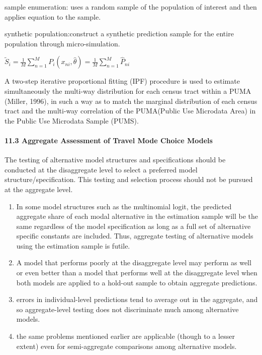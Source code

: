 \documentclass[
]{article}
\begin{document}
sample enumeration: uses a random sample of the population of interest
and then applies equation to the sample.

synthetic population:construct a synthetic prediction sample for the
entire population through micro-simulation.

\(\tilde S_i=\frac1M\sum_{n=1}^MP_i(x_{ni},\hat\theta)=\frac1M\sum_{n=1}^M\hat P_{ni}\)

A two-step iterative proportional fitting (IPF) procedure is used to
estimate simultaneously the multi-way distribution for each census tract
within a PUMA (Miller, 1996), in such a way as to match the marginal
distribution of each census tract and the multi-way correlation of the
PUMA(Public Use Microdata Area) in the Public Use Microdata Sample
(PUMS).

\hypertarget{aggregate-assessment-of-travel-mode-choice-models}{%
\paragraph{11.3 Aggregate Assessment of Travel Mode Choice
Models}\label{aggregate-assessment-of-travel-mode-choice-models}}

The testing of alternative model structures and specifications should be
conducted at the disaggregate level to select a preferred model
structure/specification. This testing and selection process should not
be pursued at the aggregate level.

\begin{enumerate}
\def\labelenumi{\arabic{enumi}.}
\item
  In some model structures such as the multinomial logit, the predicted
  aggregate share of each modal alternative in the estimation sample
  will be the same regardless of the model specification as long as a
  full set of alternative specific constants are included. Thus,
  aggregate testing of alternative models using the estimation sample is
  futile.
\item
  A model that performs poorly at the disaggregate level may perform as
  well or even better than a model that performs well at the
  disaggregate level when both models are applied to a hold-out sample
  to obtain aggregate predictions.
\item
  errors in individual-level predictions tend to average out in the
  aggregate, and so aggregate-level testing does not discriminate much
  among alternative models.
\item
  the same problems mentioned earlier are applicable (though to a lesser
  extent) even for semi-aggregate comparisons among alternative models.
\end{enumerate}
\end{document}
